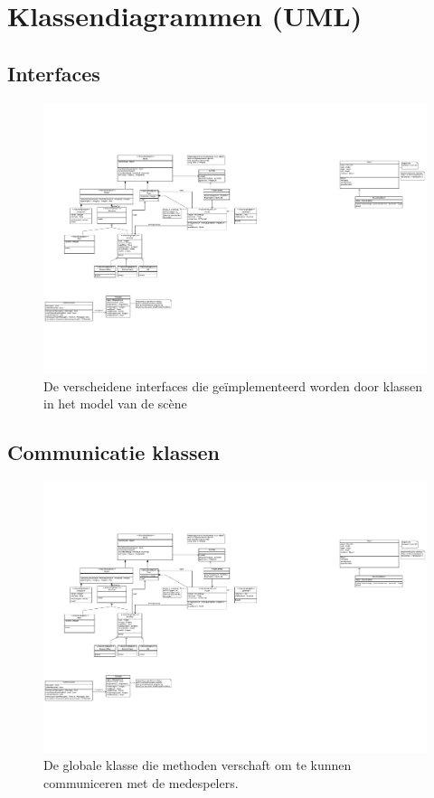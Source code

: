 \documentclass[a4paper,11pt]{article}
\begin{document}
    \label{sec:interactscenmodel}
    \newpage
    \appendix
    \section{Klassendiagrammen (UML)}
    \subsection{Interfaces}
    \begin{figure}[h]
    \centering
    	\includegraphics{../Class-diagram/Interfaces.pdf}
    	\caption{De verscheidene interfaces die ge\"implementeerd worden door klassen in het model van de sc\`ene}
    \end{figure}
    \label{app:Interfaces}
    \FloatBarrier
    \subsection{Communicatie klassen}
    \begin{figure}[h]
        \centering
    	\includegraphics{../Class-diagram/NetCommunication.pdf}
	\caption{De globale klasse die methoden verschaft om te kunnen communiceren met de medespelers.}
    \end{figure}
    \label{app:Comm}
    \FloatBarrier
    \newpage
\end{document}
